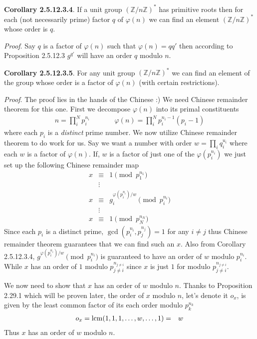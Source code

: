 \documentclass[aps,preprint,preprintnumbers,nofootinbib,showpacs,prd]{revtex4-1}
\newcommand{\nbea}{\begin{eqnarray*}}
\newcommand{\neea}{\end{eqnarray*}}
\begin{document}
{\bf Corollary 2.5.12.3.4}. If a unit group $(\mathbb{Z}/n\mathbb{Z})^*$ has primitive roots then for each (not necessarily prime) factor $q$ of $\varphi(n)$ we can find an element $(\mathbb{Z}/n\mathbb{Z})^*$ whose order is $q$.

{\it Proof}. Say $q$ is a factor of $\varphi(n)$ such that $\varphi(n) = q q'$ then according to Proposition 2.5.12.3 $g^{q'}$ will have an order $q$ modulo $n$. 

{\bf Corollary 2.5.12.3.5}. For any unit group $(\mathbb{Z}/n\mathbb{Z})^*$ we can find an element of the group whose order is a factor of $\varphi(n)$ (with certain restrictions).

{\it Proof}. The proof lies in the hands of the Chinese :) We need Chinese remainder theorem for this one. First we decompose $\varphi(n)$ into its primal constituents
%
\nbea
n = \prod_i^{N} p_i^{n_i}  ~~~~~~~~~~~~~~~~ \varphi(n) = \prod_i^N p_i^{n_i  - 1} (p_i - 1)
\neea
%
where each $p_i$ is a {\it distinct} prime number. We now utilize Chinese remainder theorem to do work for us. Say we want a number with order $w=\prod_i q_i^{u_i}$ where each $w$ is a factor of $\varphi(n)$. If, $w$ is a factor of just one of the $\varphi(p_i^{n_i})$ we just set up the following Chinese remainder map 
%
\nbea
x & \equiv & 1 \pmod{p_1^{n_1}} \\
& \vdots & \\
x & \equiv & g_i^{\varphi(p_i^{n_i})/w} \pmod{p_i^{n_i}} \\
& \vdots & \\
x & \equiv & 1 \pmod{p_N^{n_N}}
\neea
%
Since each $p_i$ is a distinct prime, $\gcd(p_i^{n_i}, p_j^{n_j}) = 1$ for any $i\neq j$ thus Chinese remainder theorem guarantees that we can find such an $x$. Also from Corollary 2.5.12.3.4, $g^{\varphi(p_i^{n_i})/w} \pmod{p_i^{n_i}}$ is guaranteed to have an order of $w$ modulo $p_i^{n_i}$. While $x$ has an order of $1$ modulo $p_{j\neq i}^{n_{j\neq i}}$ since $x$ is just $1$ for modulo $p_{j\neq i}^{n_{j\neq i}}$.

We now need to show that $x$ has an order of $w$ modulo $n$. Thanks to Proposition 2.29.1 which will be proven later, the order of $x$ modulo $n$, let's denote it $o_x$, is given by the least common factor of its each order modulo $p_k^{n_k}$
%
\nbea
o_x = {\rm lcm}(1, 1, 1, \dots, w, \dots, 1) & = & w
\neea
%
Thus $x$ has an order of $w$ modulo $n$. 
\end{document}
